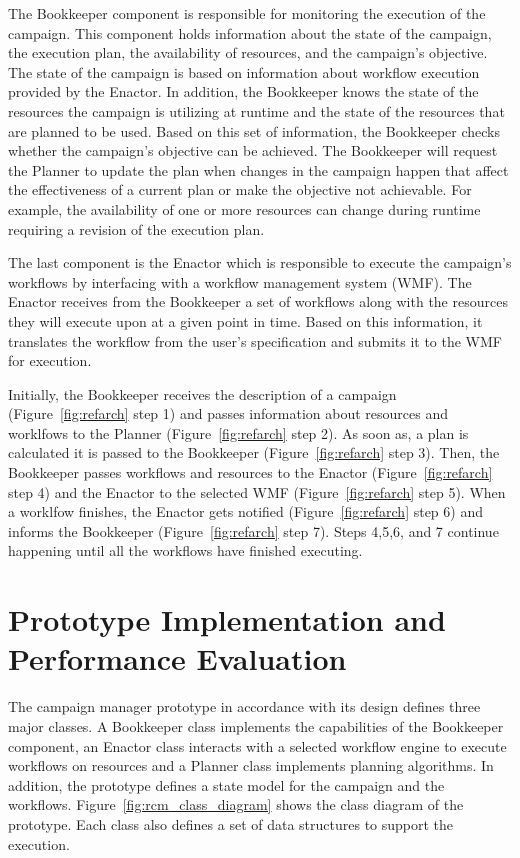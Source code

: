 The Bookkeeper component is responsible for monitoring the execution of the campaign.
This component holds information about the state of the campaign, the execution plan, the availability of resources, and the campaign's objective.
The state of the campaign is based on information about workflow execution provided by the Enactor.
In addition, the Bookkeeper knows the state of the resources the campaign is utilizing at runtime and the state of the resources that are planned to be used.
Based on this set of information, the Bookkeeper checks whether the campaign's objective can be achieved.
The Bookkeeper will request the Planner to update the plan when changes in the campaign happen that affect the effectiveness of a current plan or make the objective not achievable.
For example, the availability of one or more resources can change during runtime requiring a revision of the execution plan.

The last component is the Enactor which is responsible to execute the campaign's workflows by interfacing with a workflow management system (WMF).
The Enactor receives from the Bookkeeper a set of workflows along with the resources they will execute upon at a given point in time.
Based on this information, it translates the workflow from the user's specification and submits it to the WMF for execution.

Initially, the Bookkeeper receives the description of a campaign (Figure~\ref{fig:refarch} step 1) and passes information about resources and worklfows to the Planner (Figure~\ref{fig:refarch} step 2).
As soon as, a plan is calculated it is passed to the Bookkeeper (Figure~\ref{fig:refarch} step 3).
Then, the Bookkeeper passes workflows and resources to the Enactor (Figure~\ref{fig:refarch} step 4) and the Enactor to the selected WMF (Figure~\ref{fig:refarch} step 5).
When a worklfow finishes, the Enactor gets notified (Figure~\ref{fig:refarch} step 6) and informs the Bookkeeper (Figure~\ref{fig:refarch} step 7).
Steps 4,5,6, and 7 continue happening until all the workflows have finished executing.

\section{Prototype Implementation and Performance Evaluation}
\label{sec:cm_impl}

The campaign manager prototype in accordance with its design defines three major classes.
A Bookkeeper class implements the capabilities of the Bookkeeper component, an Enactor class interacts with a selected workflow engine to execute workflows on resources and a Planner class implements planning algorithms.
In addition, the prototype defines a state model for the campaign and the workflows.
Figure~\ref{fig:rcm_class_diagram} shows the class diagram of the prototype.
Each class also defines a set of data structures to support the execution.


